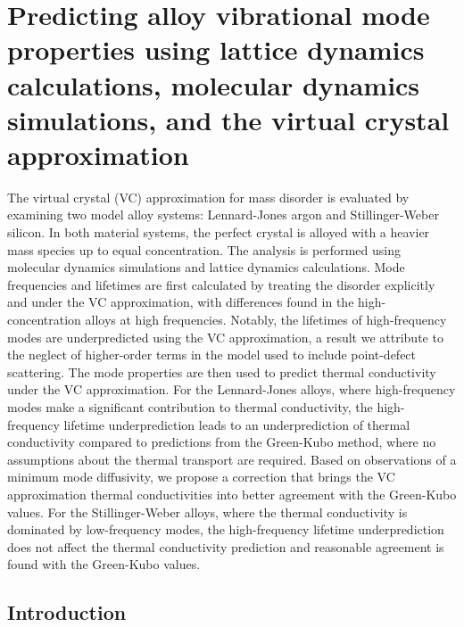 \chapter{Predicting alloy vibrational mode properties using lattice
dynamics calculations, molecular dynamics simulations, and the virtual
crystal approximation}

The virtual crystal (VC) approximation for mass disorder is evaluated by
examining two model alloy systems: Lennard-Jones argon and Stillinger-Weber
silicon. 
In both material systems, the perfect crystal is alloyed with a heavier mass
species up to equal concentration.
The analysis is performed using molecular dynamics simulations and lattice
dynamics calculations.
Mode frequencies and lifetimes are first calculated by treating the disorder
explicitly and under the VC approximation, with differences found in the
high-concentration alloys at high frequencies. 
Notably, the lifetimes of high-frequency modes are underpredicted using the
VC approximation, a result we attribute to the neglect of higher-order terms 
in the model used to include point-defect scattering.
The mode properties are then used to predict thermal conductivity under the
VC approximation.
For the Lennard-Jones alloys, where high-frequency modes make a significant
contribution to thermal conductivity, the high-frequency lifetime
underprediction leads to an underprediction of thermal conductivity compared
to predictions from the Green-Kubo method, where no assumptions about the
thermal transport are required.
Based on observations of a minimum mode diffusivity, we propose a correction
that brings the VC approximation thermal conductivities into better 
agreement with the Green-Kubo values. 
For the Stillinger-Weber alloys, where the thermal conductivity is dominated
by low-frequency modes, the high-frequency lifetime underprediction does not
affect the thermal conductivity prediction and reasonable agreement is found
with the Green-Kubo values. 

\section{\label{S:Introduction}Introduction}

